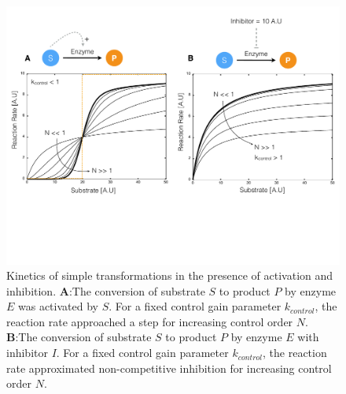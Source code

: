 \documentclass[12pt]{article}
\begin{document}
\begin{figure}
\centering
\includegraphics[width=1.0\textwidth]{./figs/Figure-3-EnzymeKinetics.pdf}
\caption{Kinetics of simple transformations in the presence of activation and inhibition. 
\textbf{A}:The conversion of substrate $S$ to product $P$ by enzyme $E$ was activated by $S$. 
For a fixed control gain parameter $k_{control}$, the reaction rate approached a step for increasing control order $N$. 
\textbf{B}:The conversion of substrate $S$ to product $P$ by enzyme $E$ with inhibitor $I$. 
For a fixed control gain parameter $k_{control}$, the reaction rate approximated non-competitive inhibition for increasing control order $N$. 
}\label{fig-kinetics-simulations}
\end{figure}

\clearpage
\end{document}
